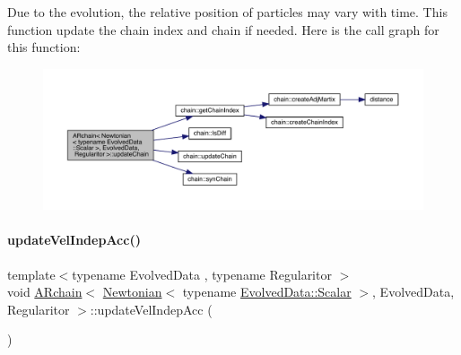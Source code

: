 Due to the evolution, the relative position of particles may vary with time. This function update the chain index and chain if needed. Here is the call graph for this function\+:\nopagebreak
\begin{figure}[H]
\begin{center}
\leavevmode
\includegraphics[width=350pt]{class_a_rchain_3_01_newtonian_3_01typename_01_evolved_data_1_1_scalar_01_4_00_01_evolved_data_00_01_regularitor_01_4_acbe31e9aa918e4f80a2763e16f0bb7bc_cgraph}
\end{center}
\end{figure}
\mbox{\label{class_a_rchain_3_01_newtonian_3_01typename_01_evolved_data_1_1_scalar_01_4_00_01_evolved_data_00_01_regularitor_01_4_a2b11ca856564416ed6727c716ed284a8}} 
\paragraph{\texorpdfstring{update\+Vel\+Indep\+Acc()}{updateVelIndepAcc()}}
{\footnotesize\ttfamily template$<$typename Evolved\+Data , typename Regularitor $>$ \\
void \mbox{\hyperlink{class_a_rchain}{A\+Rchain}}$<$ \mbox{\hyperlink{class_newtonian}{Newtonian}}$<$ typename \mbox{\hyperlink{class_a_rchain_a707e42a79e4744424a34c9007e84ee07}{Evolved\+Data\+::\+Scalar}} $>$, Evolved\+Data, Regularitor $>$\+::update\+Vel\+Indep\+Acc (\begin{DoxyParamCaption}{ }\end{DoxyParamCaption})\hspace{0.3cm}{\ttfamily [private]}}



